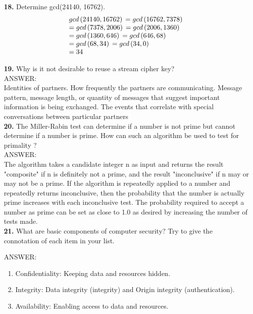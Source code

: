 \documentclass[paper=a4, fontsize=11pt]{scrartcl} %
\numberwithin{equation}{section} %
\numberwithin{figure}{section} %
\numberwithin{table}{section} %
\begin{document}
\textbf{18.} Determine gcd(24140, 16762).
\[\begin{array}{l}
gcd\left( {24140,{\rm{ }}16762} \right){\rm{ }} = {\rm{ }}gcd\left( {16762,{\rm{ }}7378} \right){\rm{ }}\\
 = {\rm{ }}gcd\left( {7378,{\rm{ }}2006} \right){\rm{ }} = {\rm{ }}gcd\left( {2006,{\rm{ }}1360} \right){\rm{ }}\\
 = {\rm{ }}gcd\left( {1360,{\rm{ }}646} \right){\rm{ }} = {\rm{ }}gcd{\rm{ }}\left( {646,{\rm{ }}68} \right){\rm{ }}\\
 = {\rm{ }}gcd\left( {68,{\rm{ }}34} \right){\rm{ }} = {\rm{ }}gcd\left( {34,{\rm{ }}0} \right){\rm{ }}\\
 = {\rm{ }}34
\end{array}\]


\textbf{19.} Why is it not desirable to reuse a stream cipher key?\\

ANSWER:\\
Identities of partners. How frequently the partners are communicating. Message pattern, message length, or quantity of messages that suggest important information is being exchanged. The events that correlate with special conversations between particular partners \\


\textbf{20.} The Miller-Rabin test can determine if a number is not prime but cannot determine if
a number is prime. How can such an algorithm be used to test for primality ?\\

ANSWER:\\
The algorithm takes a candidate integer n as input and returns the result "composite" if n is definitely not a prime, and the result "inconclusive" if n may or may not be a prime. If the algorithm is repeatedly applied to a number and repeatedly returns inconclusive, then the probability that the number is actually prime increases with each inconclusive test. The probability required to accept a number as prime can be set as close to 1.0 as desired by increasing the number of tests made. \\

\textbf{21.} What are basic components of computer security? Try to give the connotation of each item in your list.

ANSWER:\\
\begin{enumerate}
\item Confidentiality: Keeping data and resources hidden.
\item Integrity: Data integrity (integrity) and Origin integrity
  (authentication).
  \item Availability: Enabling access to data and resources.
\end{enumerate}
\end{document}
